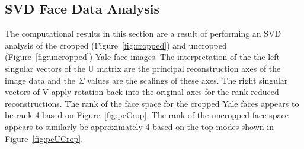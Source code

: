 \documentclass{article}
\begin{document}
\subsection{SVD Face Data Analysis}
The computational results in this section are a result of performing an SVD analysis of the cropped (Figure~\ref{fig:cropped}) and uncropped (Figure~\ref{fig:uncropped}) Yale face images. The interpretation of the the left singular vectors of the U matrix are the principal reconstruction axes of the image data and the $\Sigma$ values are the scalings of these axes. The right singular vectors of V apply rotation back into the original axes for the rank reduced reconstructions. The rank of the face space for the cropped Yale faces appears to be rank 4 based on Figure~\ref{fig:peCrop}. The rank of the uncropped face space appears to similarly be approximately 4 based on the top modes shown in Figure~\ref{fig:peUCrop}.
\end{document}
